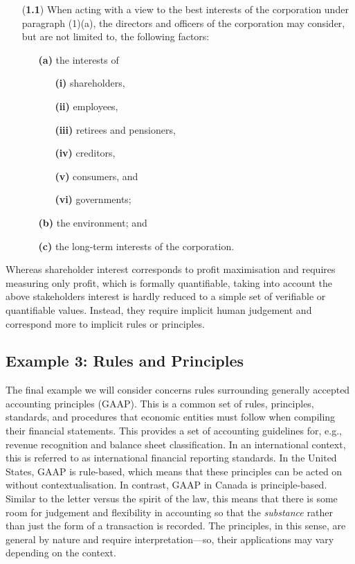 \documentclass{amsart}
\theoremstyle{indented}
\theoremstyle{indentedProp}
\theoremstyle{indented}
\theoremstyle{indented}
\theoremstyle{indented}
\theoremstyle{indented}
\theoremstyle{indented}
\begin{document}
\begin{tcolorbox}[left skip=1cm,colback=white]
\footnotesize
\singlespacing
\begin{enumerate}
    \item[({\bf 1.1})] When acting with a view to the best interests of the corporation under paragraph (1)(a), the directors and officers of the corporation may consider, but are not limited to, the following factors:
    \begin{enumerate}
        \item[]
        \item[{\bf (a)}] the interests of
        \begin{enumerate}
            \item[{\bf (i)}] shareholders,
            \item[{\bf (ii)}] employees,
            \item[{\bf (iii)}] retirees and pensioners,
            \item[{\bf (iv)}] creditors,
            \item[{\bf (v)}] consumers, and
            \item[{\bf (vi)}] governments;
            \item[]
        \end{enumerate}
        \item[{\bf (b)}] the environment; and
        \item[{\bf (c)}] the long-term interests of the corporation.
    \end{enumerate}
\end{enumerate}
\end{tcolorbox}
Whereas shareholder interest corresponds to profit maximisation and requires measuring only profit, which is formally quantifiable, taking into account the above stakeholders interest is hardly reduced to a simple set of verifiable or quantifiable values. Instead, they require implicit human judgement and correspond more to implicit rules or principles. 

\subsection{Example 3: Rules and Principles}
\label{sec:Example2}

The final example we will consider concerns rules surrounding generally accepted accounting principles (GAAP). This is a common set of rules, principles, standards, and procedures that economic entities must follow when compiling their financial statements. This provides a set of accounting guidelines for, e.g., revenue recognition and balance sheet classification. In an international context, this is referred to as international financial reporting standards. In the United States, GAAP is rule-based, which means that these principles can be acted on without contextualisation. In contrast, GAAP in Canada is principle-based. Similar to the letter versus the spirit of the law, this means that there is some room for judgement and flexibility in accounting so that the {\it substance} rather than just the form of a transaction is recorded. The principles, in this sense, are general by nature and require interpretation---so, their applications may vary depending on the context.
\end{document}
